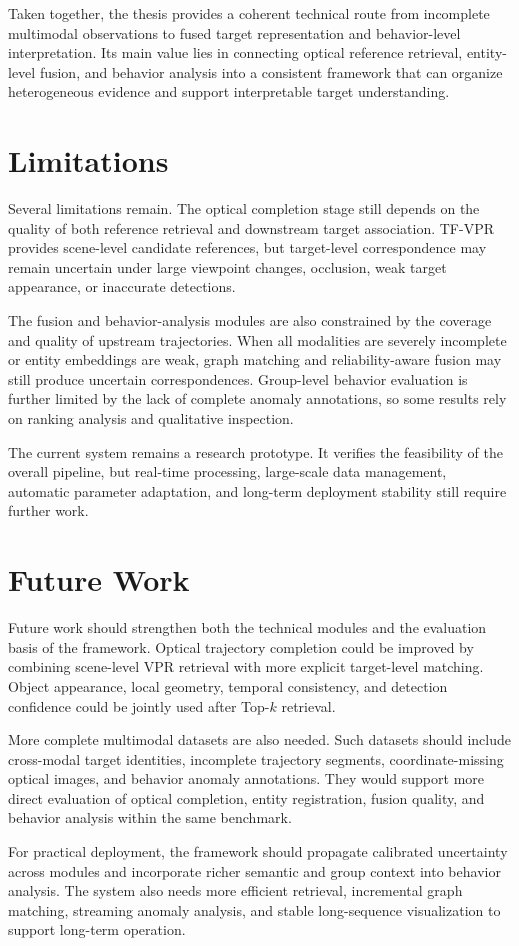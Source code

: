 Taken together, the thesis provides a coherent technical route from incomplete multimodal observations to fused target representation and behavior-level interpretation. Its main value lies in connecting optical reference retrieval, entity-level fusion, and behavior analysis into a consistent framework that can organize heterogeneous evidence and support interpretable target understanding.

\section{Limitations}
Several limitations remain. The optical completion stage still depends on the quality of both reference retrieval and downstream target association. TF-VPR provides scene-level candidate references, but target-level correspondence may remain uncertain under large viewpoint changes, occlusion, weak target appearance, or inaccurate detections.

The fusion and behavior-analysis modules are also constrained by the coverage and quality of upstream trajectories. When all modalities are severely incomplete or entity embeddings are weak, graph matching and reliability-aware fusion may still produce uncertain correspondences. Group-level behavior evaluation is further limited by the lack of complete anomaly annotations, so some results rely on ranking analysis and qualitative inspection.

The current system remains a research prototype. It verifies the feasibility of the overall pipeline, but real-time processing, large-scale data management, automatic parameter adaptation, and long-term deployment stability still require further work.

\section{Future Work}
Future work should strengthen both the technical modules and the evaluation basis of the framework. Optical trajectory completion could be improved by combining scene-level VPR retrieval with more explicit target-level matching. Object appearance, local geometry, temporal consistency, and detection confidence could be jointly used after Top-\(k\) retrieval.

More complete multimodal datasets are also needed. Such datasets should include cross-modal target identities, incomplete trajectory segments, coordinate-missing optical images, and behavior anomaly annotations. They would support more direct evaluation of optical completion, entity registration, fusion quality, and behavior analysis within the same benchmark.

For practical deployment, the framework should propagate calibrated uncertainty across modules and incorporate richer semantic and group context into behavior analysis. The system also needs more efficient retrieval, incremental graph matching, streaming anomaly analysis, and stable long-sequence visualization to support long-term operation.
